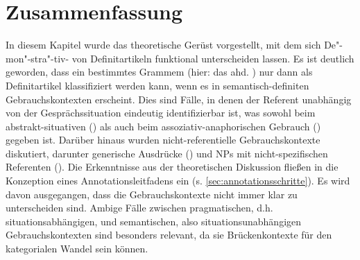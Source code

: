 \section{Zusammenfassung}

In diesem Kapitel wurde das theoretische Gerüst vorgestellt, mit dem sich De"-mon"-stra"-tiv- von Definitartikeln funktional unterscheiden lassen. Es ist deutlich geworden, dass ein bestimmtes Grammem (hier: das ahd. ) nur dann als Definitartikel klassifiziert werden kann, wenn es in semantisch-definiten Gebrauchskontexten \parencite{Lobner1985} erscheint. Dies sind Fälle, in denen der Referent unabhängig von der Gesprächssituation eindeutig identifizierbar ist, was  sowohl beim abstrakt-situativen () als auch beim assoziativ-anaphorischen Gebrauch () gegeben ist. Darüber hinaus wurden nicht-referentielle Gebrauchskontexte diskutiert, darunter generische Ausdrücke () und NPs mit nicht-spezifischen Referenten (). Die Erkenntnisse aus der theoretischen Diskussion fließen in die Konzeption eines Annotationsleitfadens ein (s. \ref{sec:annotationsschritte}). Es wird davon ausgegangen, dass die Gebrauchskontexte nicht immer klar zu unterscheiden sind. Ambige Fälle zwischen pragmatischen, d.h. situationsabhängigen, und semantischen, also situationsunabhängigen Gebrauchskontexten sind besonders relevant, da sie Brückenkontexte für den kategorialen Wandel sein können. 
